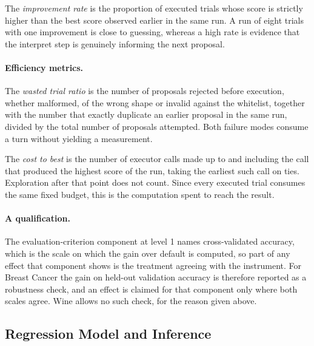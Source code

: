 \documentclass[11pt]{article}
\begin{document}
The \emph{improvement rate} is the proportion of executed trials whose score is strictly higher than the best score observed earlier in the same run. A run of eight trials with one improvement is close to guessing, whereas a high rate is evidence that the interpret step is genuinely informing the next proposal.

\paragraph{Efficiency metrics.} The \emph{wasted trial ratio} is the number of proposals rejected before execution, whether malformed, of the wrong shape or invalid against the whitelist, together with the number that exactly duplicate an earlier proposal in the same run, divided by the total number of proposals attempted. Both failure modes consume a turn without yielding a measurement.

The \emph{cost to best} is the number of executor calls made up to and including the call that produced the highest score of the run, taking the earliest such call on ties. Exploration after that point does not count. Since every executed trial consumes the same fixed budget, this is the computation spent to reach the result.

\paragraph{A qualification.} The evaluation-criterion component at level 1 names cross-validated accuracy, which is the scale on which the gain over default is computed, so part of any effect that component shows is the treatment agreeing with the instrument. For Breast Cancer the gain on held-out validation accuracy is therefore reported as a robustness check, and an effect is claimed for that component only where both scales agree. Wine allows no such check, for the reason given above.

\subsection{Regression Model and Inference}
\end{document}
